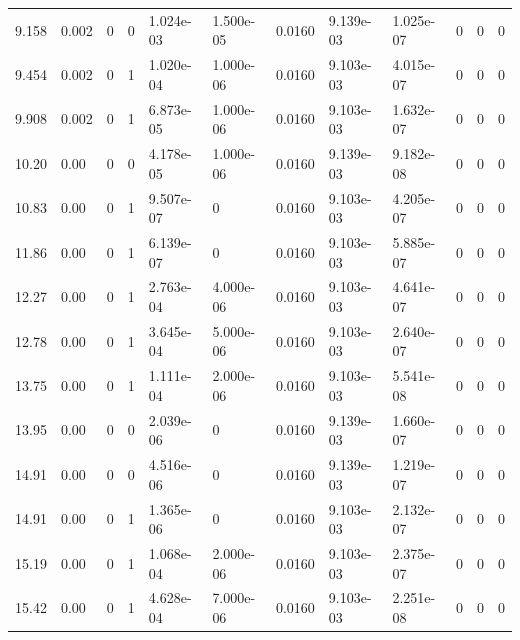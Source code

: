 \documentclass[preview]{standalone}
\begin{document}
{{\begin{tabular}{L{1.2cm}C{1.2cm} C{0.3cm}C{0.5cm} C{1.4cm}C{1.4cm} C{1.4cm}C{1.4cm} C{1.6cm}C{1.6cm} C{1.6cm}C{1.6cm}}
  9.158  &  0.002  & 0     &  0 &  1.024e-03  & 1.500e-05  &  0.0160&   9.139e-03& 1.025e-07 & 0   &  0 & 0  \\ 
  9.454  &  0.002  & 0     &  1 &  1.020e-04  & 1.000e-06  &  0.0160&   9.103e-03& 4.015e-07 & 0   &  0 & 0  \\ 
  9.908  &  0.002  & 0     &  1 &  6.873e-05  & 1.000e-06  &  0.0160&   9.103e-03& 1.632e-07 & 0   &  0 & 0  \\ 
  10.20  &  0.00  & 0     &  0 &  4.178e-05  & 1.000e-06  &  0.0160&   9.139e-03& 9.182e-08 & 0   &  0 & 0  \\ 
  10.83  &  0.00  & 0     &  1 &  9.507e-07  & 0  &  0.0160&   9.103e-03& 4.205e-07 & 0   &  0 & 0  \\ 
  11.86  &  0.00  & 0     &  1 &  6.139e-07  & 0  &  0.0160&   9.103e-03& 5.885e-07 & 0   &  0 & 0  \\ 
  12.27  &  0.00  & 0     &  1 &  2.763e-04  & 4.000e-06  &  0.0160&   9.103e-03& 4.641e-07 & 0   &  0 & 0  \\ 
  12.78  &  0.00  & 0     &  1 &  3.645e-04  & 5.000e-06  &  0.0160&   9.103e-03& 2.640e-07 & 0   &  0 & 0  \\ 
  13.75  &  0.00  & 0     &  1 &  1.111e-04  & 2.000e-06  &  0.0160&   9.103e-03& 5.541e-08 & 0   &  0 & 0  \\ 
  13.95  &  0.00  & 0     &  0 &  2.039e-06  & 0  &  0.0160&   9.139e-03& 1.660e-07 & 0   &  0 & 0  \\ 
  14.91  &  0.00  & 0     &  0 &  4.516e-06  & 0  &  0.0160&   9.139e-03& 1.219e-07 & 0   &  0 & 0  \\ 
  14.91  &  0.00  & 0     &  1 &  1.365e-06  & 0  &  0.0160&   9.103e-03& 2.132e-07 & 0   &  0 & 0  \\ 
  15.19  &  0.00  & 0     &  1 &  1.068e-04  & 2.000e-06  &  0.0160&   9.103e-03& 2.375e-07 & 0   &  0 & 0  \\ 
  15.42  &  0.00  & 0     &  1 &  4.628e-04  & 7.000e-06  &  0.0160&   9.103e-03& 2.251e-08 & 0   &  0 & 0  \\ 
\hline 
\end{tabular} 

}}
\end{document}
